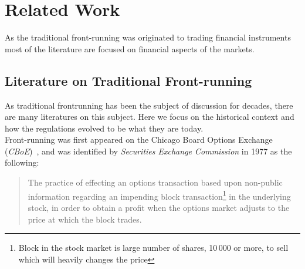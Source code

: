
\section{Related Work}
As the traditional front-running was originated to trading financial instruments most of the literature are focused on financial aspects of the markets. %


\subsection{Literature on Traditional Front-running}


As traditional frontrunning has been the subject of discussion for decades, there are many literatures on this subject. Here we focus on the historical context and how the regulations evolved to be what they are today.\\
Front-running was first appeared on the Chicago Board Options Exchange (\textit{CBoE})~\cite{markham1988front}, and was identified by \textit{Securities Exchange Commission} in 1977 as the following:
\begin{quote}
The practice of effecting an options transaction based upon non-public information regarding an impending block transaction\footnote{Block in the stock market is large number of shares, 10\,000 or more, to sell which will heavily changes the price} in the underlying stock, in order to obtain a profit when the options market adjusts to the price at which the block trades. ~\cite{sec1978optionsmarket}
\end{quote} 


